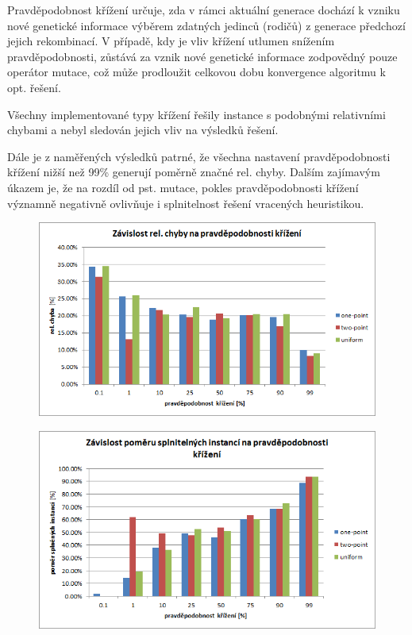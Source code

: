 \documentclass[12pt,oneside,a4paper]{article}
\begin{document}
Pravděpodobnost křížení určuje, zda v rámci aktuální generace dochází k vzniku nové genetické informace výběrem zdatných jedinců (rodičů) z generace předchozí jejich rekombinací. V případě, kdy je vliv křížení utlumen snížením pravděpodobnosti, zůstává za vznik nové genetické informace zodpovědný pouze operátor mutace, což může prodloužit celkovou dobu konvergence algoritmu k opt. řešení.

Všechny implementované typy křížení řešily instance s podobnými relativními chybami a nebyl sledován jejich vliv na výsledků řešení. 

Dále je z naměřených výsledků patrné, že všechna nastavení pravděpodobnosti křížení nižší než 99\% generují poměrně značné rel. chyby. Dalším zajímavým úkazem je, že na rozdíl od pst. mutace, pokles pravděpodobnosti křížení významně negativně ovlivňuje i splnitelnost řešení vracených heuristikou.

\begin{figure}[ht]
\centering
\includegraphics[scale=0.9]{obr/cross-err.png}
\end{figure}


\begin{figure}[ht]
\centering
\includegraphics[scale=0.9]{obr/cross-sat.png}
\end{figure}
\end{document}
